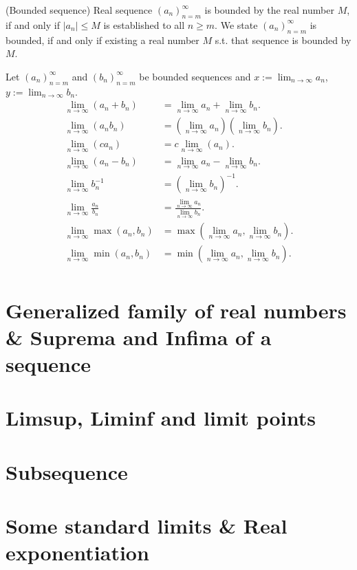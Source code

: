 \documentclass{article}
\begin{document}
\begin{definition}
    (Bounded sequence) Real sequence $(a_n)_{n=m}^{\infty}$ is bounded by the real number $M$, if and only if $|a_n| \leq M$ is established to all $n \geq m$. We state $(a_n)_{n=m}^{\infty}$ is bounded, if and only if existing a real number $M$ s.t. that sequence is bounded by $M$.
\end{definition}
\begin{theorem}
    Let $(a_n)_{n=m}^{\infty}$ and $(b_n)_{n=m}^{\infty}$ be bounded sequences and $x := \lim_{n \to \infty}a_n$, $y := \lim_{n \to \infty}b_n$.
    \begin{align*}
        \lim_{n\to\infty}(a_n + b_n) &= \lim_{n\to\infty}a_n + \lim_{n\to\infty}b_n. \\
        \lim_{n\to\infty}(a_n b_n) &= (\lim_{n\to\infty}a_n) (\lim_{n\to\infty}b_n). \\
        \lim_{n\to\infty}(c a_n) &= c\lim_{n\to\infty}(a_n). \\
        \lim_{n\to\infty}(a_n - b_n) &= \lim_{n\to\infty}a_n - \lim_{n\to\infty}b_n. \\
        \lim_{n\to\infty}b_n^{-1} &= (\lim_{n\to\infty}b_n)^{-1}. \\
        \lim_{n\to\infty}\frac{a_n}{b_n} &= \frac{\lim_{n\to\infty}a_n}{\lim_{n\to\infty}b_n}. \\
        \lim_{n\to\infty}\max (a_n, b_n) &= \max (\lim_{n\to\infty}a_n, \lim_{n\to\infty}b_n). \\
        \lim_{n\to\infty}\min (a_n, b_n) &= \min (\lim_{n\to\infty}a_n, \lim_{n\to\infty}b_n). \\
    \end{align*}
\end{theorem}

\section{Generalized family of real numbers \& Suprema and Infima of a sequence}

\section{Limsup, Liminf and limit points}

\section{Subsequence}

\section{Some standard limits \& Real exponentiation}
\end{document}
